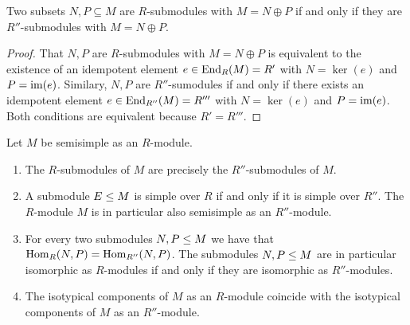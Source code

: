\begin{lemma}
  \label{lemma: same direct sum decompositions}
  Two subsets $N, P \subseteq M$ are $R$-submodules with $M = N \oplus P$ if and only if they are $R''$-submodules with $M = N \oplus P$.
\end{lemma}


\begin{proof}
  That $N, P$ are $R$-submodules with $M = N \oplus P$ is equivalent to the existence of an idempotent element $e \in \operatorname{End}_R(M) = R'$ with $N = \ker(e)$ and $P = \operatorname{im}(e)$.
  Similary, $N, P$ are $R''$-sumodules if and only if there exists an idempotent element $e \in \operatorname{End}_{R''}(M) = R'''$ with $N = \ker(e)$ and $P = \operatorname{im}(e)$.
  Both conditions are equivalent because $R' = R'''$.
\end{proof}


\begin{proposition}
  Let $M$ be semisimple as an $R$-module.
  \begin{enumerate}
    \item
      \label{enumerate: same submodules}
      The $R$-submodules of $M$ are precisely the $R''$-submodules of $M$.
    \item
      A submodule $E \leq M$ is simple over $R$ if and only if it is simple over $R''$.
      The $R$-module $M$ is in particular also semisimple as an $R''$-module.
    \item
      \label{enumerate: same isomorphisms}
      For every two submodules $N, P \leq M$ we have that $\operatorname{Hom}_R(N,P) = \operatorname{Hom}_{R''}(N,P)$.
      The submodules $N, P \leq M$ are in particular isomorphic as $R$-modules if and only if they are isomorphic as $R''$-modules.
    \item
      The isotypical components of $M$ as an $R$-module coincide with the isotypical components of $M$ as an $R''$-module.
  \end{enumerate}
\end{proposition}


